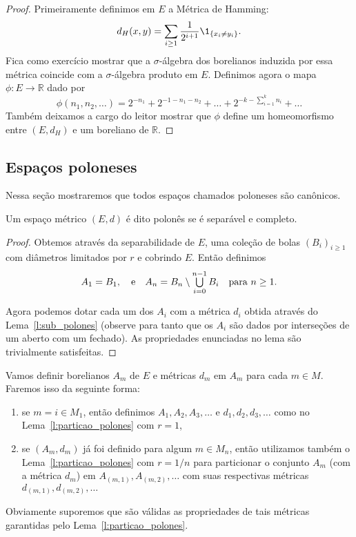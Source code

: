 \begin{proof}
  Primeiramente definimos em $E$ a Métrica de Hamming:
  \begin{equation}
    \label{e:hamming_distance}
    d_H(x,y) = \sum_{i \geq 1} \frac{1}{2^{i + 1}} \1_{\{x_i \neq y_i\}}.
  \end{equation}
  Fica como exercício mostrar que a $\sigma$-álgebra dos borelianos induzida por essa métrica coincide com a $\sigma$-álgebra produto em $E$.
  Definimos agora o mapa $\phi:E \to \mathbb{R}$ dado por
  \begin{equation}
    \phi(n_1, n_2, \dots) = 2^{-n_1} + 2^{-1 - n_1 - n_2} + \dots + 2^{-k - \sum_{i=1}^k n_i} + \dots
  \end{equation}
  Também deixamos a cargo do leitor mostrar que $\phi$ define um homeomorfismo entre $(E,d_H)$ e um boreliano de $\mathbb{R}$.
\end{proof}

\subsection{Espaços poloneses}

Nessa seção mostraremos que todos espaços chamados poloneses são canônicos.

\begin{definition}
  Um espaço métrico $(E,d)$ é dito polonês  se é separável e completo.
\end{definition}


\begin{proof}
  Obtemos através da separabilidade de $E$, uma coleção de bolas $(B_i)_{i \geq 1}$ com diâmetros limitados por $r$ e cobrindo $E$.
  Então definimos
  \begin{equation}
    A_1 = B_1, \quad \text{e} \quad A_n = B_n \setminus \operatorname*{{\textstyle \bigcup}}_{i=0}^{n-1} B_i \quad \text{para $n \geq 1$.}
  \end{equation}

  Agora podemos dotar cada um dos $A_i$ com a métrica $d_i$ obtida através do Lema~\ref{l:sub_polones} (observe para tanto que os $A_i$ são dados por interseções de um aberto com um fechado).
  As propriedades enunciadas no lema são trivialmente satisfeitas.
\end{proof}


  Vamos definir borelianos $A_m$ de $E$ e métricas $d_m$ em $A_m$ para cada $m \in M$.
  Faremos isso da seguinte forma:
  \begin{enumerate}[\quad a)]
  \item se $m = i \in M_1$, então definimos $A_1, A_2, A_3, \dots$ e $d_1, d_2, d_3, \dots$ como no Lema~\ref{l:particao_polones} com $r = 1$,
  \item se $(A_m, d_m)$ já foi definido para algum $m \in M_n$, então utilizamos também o Lema~\ref{l:particao_polones} com $r = 1/n$ para particionar o conjunto $A_m$ (com a métrica $d_m$) em $A_{(m,1)}, A_{(m,2)}, \dots$ com suas respectivas métricas $d_{(m,1)}, d_{(m,2)}, \dots$
  \end{enumerate}
  Obviamente suporemos que são válidas as propriedades de tais métricas garantidas pelo Lema~\ref{l:particao_polones}.

